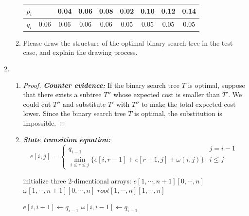 \documentclass[12pt,a4paper]{article}
\makeatletter
\newtheorem*{solution}{Solution}
\theoremstyle{definition}
\renewenvironment{solution}[1][Solution] {\par\pushQED{\qed}\normalfont\topsep6\p@\@plus6\p@\relax\trivlist\item[\hskip\labelsep\bfseries#1\@addpunct{.}]\ignorespaces}{\popQED\endtrivlist\@endpefalse} \makeatother
\makeatother
\begin{document}
\begin{enumerate}
\begin{enumerate}
\begin{table}[H]
\begin{tabular}{|c|cccccccc|}
					\hline
					$ p_{i} $&&0.04&0.06&0.08&0.02&0.10&0.12&0.14\\
					\hline
					$ q_{i} $&0.06&0.06&0.06&0.06&0.05&0.05&0.05&0.05\\
					\hline
				\end{tabular}
			\end{table}
			\item Please draw the structure of the optimal binary search tree in the test case, and explain the drawing process.   
		\end{enumerate}
		    \begin{solution}
		    ~\\
		        \begin{enumerate}
		            \item 
		            \begin{proof}
		            \textbf{\textit{Counter evidence:}} 
		            If the binary search tree $T$ is optimal, suppose that there exists a subtree $T''$ whose expected cost is smaller than $T'$. We could cut $T''$ and substitute $T'$ with $T''$ to make the total expected cost lower. Since the binary search tree $T$ is optimal, the substitution is impossible. 
		            \end{proof}
		            
		            \item\textbf{\textit{State transition equation:}}
		            \begin{equation}
		                e[i,j]=\begin{cases}
		                q_{i-1} & j=i-1\\
		                \mathop{min}\limits_{i\leq r\leq j}\{e[i,r-1]+e[r+1,j]+\omega (i,j)\} & i\leq j
		                \end{cases}
		            \end{equation}
		            
		            \begin{algorithm}[H]
		            initialize three 2-dimentional arrays:\;
		            $e[1,\cdots,n+1][0,\cdots,n]$\;
		            $\omega [1,\cdots,n+1][0,\cdots,n]$\;
		            $root[1,\cdots,n][1,\cdots,n]$\;
		            \BlankLine
                    
                    {
                        $e[i,i-1]\leftarrow q_{i-1}$\;
                        $\omega [i,i-1]\leftarrow q_{i-1}$\;
                    }
                    

\end{algorithm}
\end{enumerate}
\end{solution}
\end{enumerate}
\end{document}
